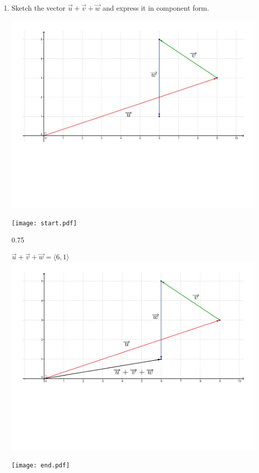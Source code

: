 \documentclass[12pt]{article}
\begin{document}
\begin{enumerate}
\newpage

\item Sketch the vector $\overrightarrow{u}+\overrightarrow{v}+\overrightarrow{w}$ and express it in component form.

\begin{center}
\includegraphics[scale=0.4]{vector2.pdf}
\end{center}

\texttt{[image: start.pdf]}
{{{0.75\linewidth}{\begin{center}$\overrightarrow{u}+\overrightarrow{v}+\overrightarrow{w}=\langle 6,1 \rangle$\\
\includegraphics[scale=0.3]{vector2ans.pdf}\end{center}}}}
\texttt{[image: end.pdf]}



\end{enumerate}
\end{document}
